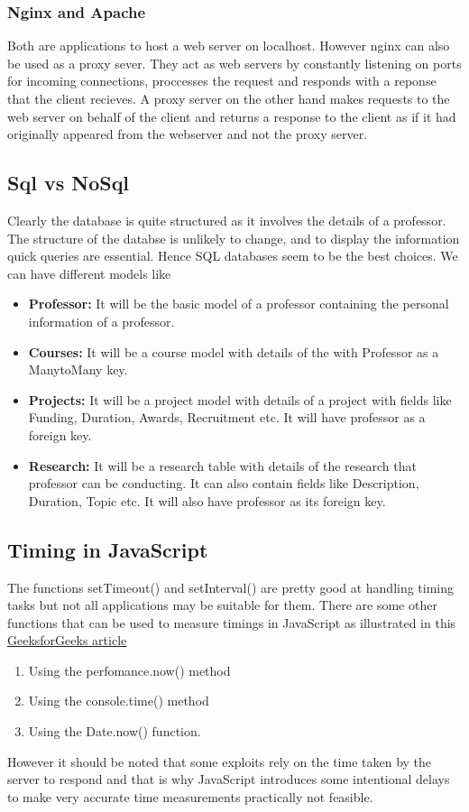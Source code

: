 \documentclass[12pt]{article}
\begin{document}
\subsubsection{Nginx and Apache}
Both are applications to host a web server on localhost. However nginx can also be used as a proxy sever. They act as web servers by constantly listening on ports for incoming connections, proccesses the request and responds with a reponse that the client recieves.
A proxy server on the other hand makes requests to the web server on behalf of the client and returns a response to the client as if it had originally appeared from the webserver and not the proxy server.

\subsection{Sql vs NoSql}

Clearly the database is quite structured as it involves the details of a professor. The structure of the databse is unlikely to change, and to display the information quick queries are essential. Hence SQL databases seem to be the best choices.
We can have different models like

\begin{itemize}
    \item \textbf{Professor: }It will be the basic model of a professor containing the personal information of a professor.
    \item \textbf{Courses: }It will be a course model with details of the with Professor as a ManytoMany key.
    \item \textbf{Projects: }It will be a project model with details of a project with fields like Funding, Duration, Awards, Recruitment etc. It will have professor as a foreign key.
    \item \textbf{Research: }It will be a research table with details of the research that professor can be conducting. It can also contain fields like Description, Duration, Topic etc. It will also have professor as its foreign key. 
\end{itemize}

\subsection{Timing in JavaScript}
The functions setTimeout() and setInterval() are pretty good at handling timing tasks but not all applications may be suitable for them.
There are some other functions that can be used to measure timings in JavaScript as illustrated in this \href{https://www.geeksforgeeks.org/how-to-measure-time-taken-by-a-function-to-execute-using-javascript/}{GeeksforGeeks article}
\begin{enumerate}
    \item Using the perfomance.now() method
    \item Using the console.time() method
    \item Using the Date.now() function.
\end{enumerate}

However it should be noted that some exploits rely on the time taken by the server to respond and that is why JavaScript introduces some intentional delays to make very accurate time measurements practically not feasible.
\end{document}
